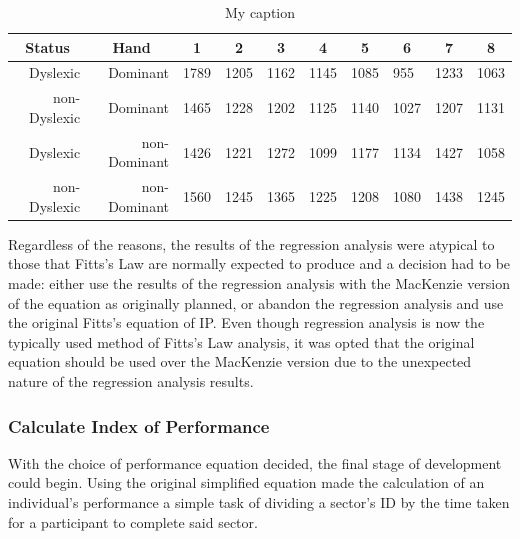 		\begin{table}[]
			\centering
			\caption{My caption}
			\label{tab_pat_4_mt}
			\begin{tabularx}{\textwidth}{|r|r|X|X|X|X|X|X|X|X|}
				\hline
				\multicolumn{1}{|c|}{\textbf{Status}} & \multicolumn{1}{c|}{\textbf{Hand}} & \multicolumn{1}{c|}{\textbf{1}} & \multicolumn{1}{c|}{\textbf{2}} & \multicolumn{1}{c|}{\textbf{3}} & \multicolumn{1}{c|}{\textbf{4}} & \multicolumn{1}{c|}{\textbf{5}} & \multicolumn{1}{c|}{\textbf{6}} & \multicolumn{1}{c|}{\textbf{7}} & \multicolumn{1}{c|}{\textbf{8}} \\ \hline
				Dyslexic                              & Dominant                           & 1789       & 1205       & 1162       & 1145       & 1085       & 955        & 1233       & 1063       \\ \hline
				non-Dyslexic                          & Dominant                           & 1465       & 1228       & 1202       & 1125       & 1140       & 1027       & 1207       & 1131       \\ \hline
				Dyslexic                              & non-Dominant                       & 1426       & 1221       & 1272       & 1099       & 1177       & 1134       & 1427       & 1058       \\ \hline
				non-Dyslexic                          & non-Dominant                       & 1560       & 1245       & 1365       & 1225       & 1208       & 1080       & 1438       & 1245       \\ \hline
			\end{tabularx}
		\end{table}
	
			Regardless of the reasons, the results of the regression analysis were atypical to those that Fitts’s Law are normally expected to produce and a decision had to be made: either use the results of the regression analysis with the MacKenzie version of the equation as originally planned, or abandon the regression analysis and use the original Fitts’s equation of IP. Even though regression analysis is now the typically used method of Fitts’s Law analysis, it was opted that the original equation should be used over the MacKenzie version due to the unexpected nature of the regression analysis results.
			
		\subsubsection{Calculate Index of Performance}
			With the choice of performance equation decided, the final stage of development could begin. Using the original simplified equation made the calculation of an individual's performance a simple task of dividing a sector’s ID by the time taken for a participant to complete said sector. 
		
